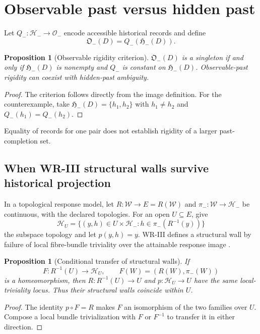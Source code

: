 \documentclass[11pt]{article}
\newtheorem{proposition}[definition]{Proposition}
\newcommand{\Wcal}{\mathcal W}
\newcommand{\Hminus}{\mathcal H_-}
\newcommand{\Pcal}{\mathfrak H_-}
\begin{document}
\section{Observable past versus hidden past}
Let $Q_-:\Hminus\to\mathcal O_-$ encode accessible historical records and define
\[
\mathfrak O_-(D)=Q_-(\Pcal(D)).
\]
\begin{proposition}[Observable rigidity criterion]
\label{prop:observable-rigidity}
$\mathfrak O_-(D)$ is a singleton if and only if $\Pcal(D)$ is
nonempty and $Q_-$ is constant on $\Pcal(D)$. Observable-past rigidity
can coexist with hidden-past ambiguity.
\end{proposition}
\begin{proof}
The criterion follows directly from the image definition. For the
counterexample, take $\Pcal(D)=\{h_1,h_2\}$ with $h_1\ne h_2$ and
$Q_-(h_1)=Q_-(h_2)$.
\end{proof}
Equality of records for one pair does not establish rigidity of a
larger past-completion set.


\subsection{When WR-III structural walls survive historical projection}

In a topological response model, let $R:\Wcal\to E=R(\Wcal)$
and $\pi_-:\Wcal\to\Hminus$ be continuous, with the declared
topologies. For an open $U\subseteq E$, give
\[
\mathcal H_U
=\{(y,h)\in U\times\Hminus:h\in\pi_-(R^{-1}(y))\}
\]
the subspace topology and let $p(y,h)=y$.
WR-III defines a structural wall by failure of local fibre-bundle
triviality over the attainable response image
\cite[Section 8]{WRIII}.

\begin{proposition}[Conditional transfer of structural walls]
\label{prop:wall-transfer}
If
\[
F:R^{-1}(U)\longrightarrow\mathcal H_U,
\qquad F(W)=(R(W),\pi_-(W))
\]
is a homeomorphism, then $R:R^{-1}(U)\to U$ and
$p:\mathcal H_U\to U$ have the same local-triviality locus.
Thus their structural walls coincide within $U$.
\end{proposition}
\begin{proof}
The identity $p\circ F=R$ makes $F$ an isomorphism of the two
families over $U$. Compose a local bundle trivialization with $F$
or $F^{-1}$ to transfer it in either direction.
\end{proof}
\end{document}
